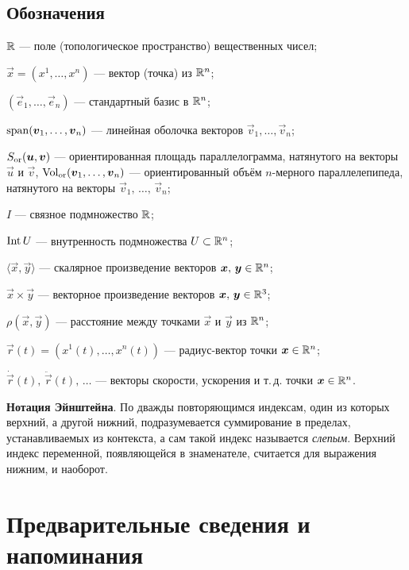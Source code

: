 \subsection*{Обозначения}

\begin{center}
\begin{minipage}{.9\textwidth}
	$\mathbb{R}$ --- поле (топологическое пространство) вещественных чисел;

	$\vec{x} = (x^1, \ldots, x^n)$ --- вектор (точка) из $\mathbb{R}^n$;
	
	$(\vec{e}_1, \ldots, \vec{e}_n)$ --- стандартный базис в $\mathbb{R}^n$;

	$\operatorname{span}(\boldsymbol{v}_1, \ldots, \boldsymbol{v}_n)$ --- линейная оболочка векторов $\vec{v}_1, \ldots, \vec{v}_n$;

	$S_{\mathrm{or}}(\boldsymbol{u}, \boldsymbol{v})$ --- ориентированная площадь параллелограмма, натянутого на векторы $\vec{u}$ и $\vec{v}$, $\operatorname{Vol}_{\mathrm{or}}(\boldsymbol{v}_1, \ldots, \boldsymbol{v}_n)$ --- ориентированный объём $n$-мерного параллелепипеда, натянутого на векторы $\vec{v}_1,\,\ldots,\,\vec{v}_n$;

	$I$ --- связное подмножество $\mathbb{R}$;

	$\operatorname{Int} U$ --- внутренность подмножества $U \subset \mathbb{R}^n$;

	$\langle\vec{x}, \vec{y}\rangle$ --- скалярное произведение векторов $\boldsymbol{x},\,\boldsymbol{y} \in \mathbb{R}^n$;

	$\vec{x} \times \vec{y}$ --- векторное произведение векторов $\boldsymbol{x},\,\boldsymbol{y} \in \mathbb{R}^3$;

	$\rho(\vec{x}, \vec{y})$ --- расстояние между точками $\vec{x}$ и $\vec{y}$ из $\mathbb{R}^n$;

	$\vec{r}(t) = (x^1(t), \ldots, x^n(t))$ --- радиус-вектор точки $\boldsymbol{x} \in \mathbb{R}^n$;

	$\dot{\vec{r}}(t),\,\ddot{\vec{r}}(t),\,\ldots$ --- векторы скорости, ускорения и т.\,д. точки $\boldsymbol{x} \in \mathbb{R}^n$.

	\medskip
	\textbf{Нотация Эйнштейна}. {\small По дважды повторяющимся индексам, один из которых верхний, а другой нижний, подразумевается суммирование в пределах, устанавливаемых из контекста, а сам такой индекс называется \textit{слепым}. Верхний индекс переменной, появляющейся в знаменателе, считается для выражения нижним, и наоборот.}
\end{minipage}
\end{center}

\section{Предварительные сведения и напоминания}

